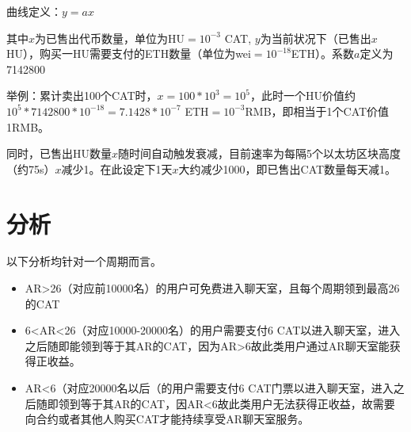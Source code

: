 \documentclass[12pt]{article}
\begin{document}
曲线定义：$ y=ax
$

其中$x$为已售出代币数量，单位为HU$=10^{-3}$ CAT, $y$为当前状况下（已售出$x$ HU），购买一HU需要支付的ETH数量（单位为wei$=10^{-18}$ETH）。系数$a$定义为7142800

举例：累计卖出100个CAT时，$x=100*10^3=10^5$，此时一个HU价值约
$10^5*7142800*10^{-18}=7.1428*10^{-7}$ ETH$=10^{-3} $RMB，即相当于1个CAT价值1RMB。

同时，已售出HU数量$x$随时间自动触发衰减，目前速率为每隔5个以太坊区块高度（约75s）$x$减少1。在此设定下1天$x$大约减少1000，即已售出CAT数量每天减1。

\section*{分析}
以下分析均针对一个周期而言。
 \begin{itemize}
\item AR>26（对应前10000名）的用户可免费进入聊天室，且每个周期领到最高26的CAT
\item 6<AR<26（对应10000-20000名）的用户需要支付$6$ CAT以进入聊天室，进入之后随即能领到等于其AR的CAT，因为AR>6故此类用户通过AR聊天室能获得正收益。
\item AR<6（对应20000名以后（的用户需要支付$6$ CAT门票以进入聊天室，进入之后随即领到等于其AR的CAT，因AR<6故此类用户无法获得正收益，故需要向合约或者其他人购买CAT才能持续享受AR聊天室服务。
\end{itemize}
\end{document}

